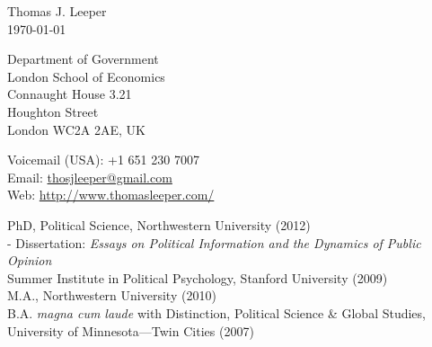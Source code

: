 \documentclass[12pt]{article}
\renewcommand{\section}[1]{\pagebreak[3]%
    \llap{\scshape\smash{\parbox[t]{\marginparwidth}{\raggedright {\color{lg}#1}}}}%
    \vspace{-\baselineskip}\par}
\newcommand{\entry}[1]{\indent {\color{lg}\guillemotright}\hspace{2pt}#1\vspace{.25em}\\}
\newcommand{\subentry}[1]{{\color{lg}-} #1\vspace{.25em}\\}
\begin{document}
{\LARGE Thomas J. Leeper}\\

\today\\

\begin{minipage}[b]{0.5\linewidth}
Department of Government\\
London School of Economics\\
Connaught House 3.21\\
Houghton Street\\
London WC2A 2AE, UK\\
\end{minipage}
\begin{minipage}[b]{0.5\linewidth}
Voicemail (USA): +1 651 230 7007\\
Email: \href{mailto:thosjleeper@gmail.com}{thosjleeper@gmail.com}\\
Web: \href{http://www.thomasleeper.com/}{http://www.thomasleeper.com/}\\
\end{minipage}

\section{Education}
\entry{PhD, Political Science, Northwestern University (2012)}
\subentry{Dissertation: {\em Essays on Political Information and the Dynamics of Public Opinion}}
\entry{Summer Institute in Political Psychology, Stanford University (2009)}
\entry{M.A., Northwestern University (2010)}
\entry{B.A. {\em magna cum laude} with Distinction, Political Science \& Global Studies, University of Minnesota---Twin Cities (2007)}
\end{document}
